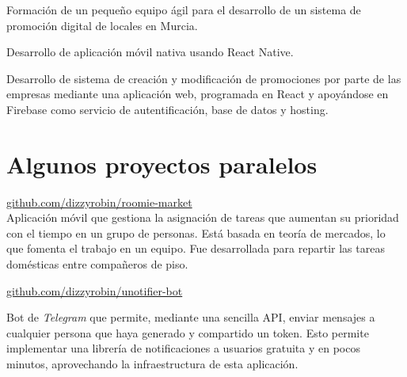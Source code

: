 \documentclass[letterpaper]{deedy-resume} %
\begin{document}
\begin{minipage}[t]{0.66\textwidth}
\begin{tightitemize}
\item Formación de un pequeño equipo ágil para el desarrollo de un sistema de promoción digital de locales en Murcia.
\item Desarrollo de aplicación móvil nativa usando React Native.
\item Desarrollo de sistema de creación y modificación de promociones por parte de las empresas mediante una aplicación web, programada en React y apoyándose en Firebase como servicio de autentificación, base de datos y hosting.
\end{tightitemize}

\sectionspace


\section{Algunos proyectos paralelos}

\href{https://github.com/dizzyrobin/roomie-market}{github.com/dizzyrobin/roomie-market} \\

\fontsize{11pt}{12pt}\normalfont
Aplicación móvil que gestiona la asignación de tareas que aumentan su prioridad con el tiempo en un grupo de personas. Está basada en teoría de mercados, lo que fomenta el trabajo en un equipo. Fue desarrollada para repartir las tareas domésticas entre compañeros de piso.

\sectionspace


\href{https://github.com/dizzyrobin/unotifier-bot}{github.com/dizzyrobin/unotifier-bot}

Bot de \textit{Telegram} que permite, mediante una sencilla API, enviar mensajes a cualquier persona que haya generado y compartido un token. Esto permite implementar una librería de notificaciones a usuarios gratuita y en pocos minutos, aprovechando la infraestructura de esta aplicación.

\sectionspace



\end{minipage}
\end{document}
